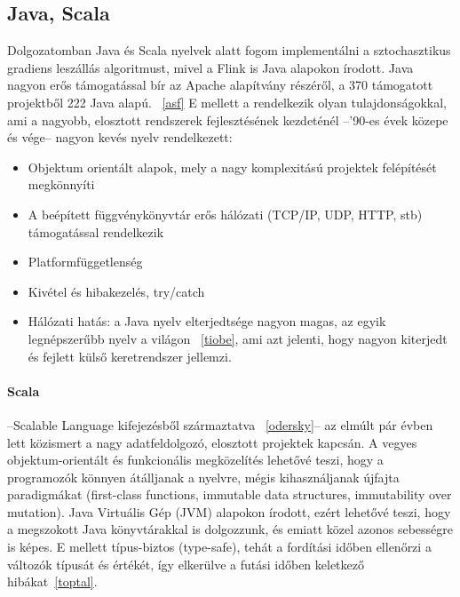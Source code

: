 \documentclass[a4paper,12pt]{article}
\begin{document}
\subsection{Java, Scala}
Dolgozatomban Java és Scala nyelvek alatt fogom implementálni a sztochasztikus gradiens leszállás algoritmust, mivel a Flink is Java alapokon írodott. Java nagyon erős támogatással bír az Apache alapítvány részéről, a 370 támogatott projektből 222 Java alapú. ~\ref{asf} E mellett a rendelkezik olyan tulajdonságokkal, ami a nagyobb, elosztott rendszerek fejlesztésének kezdeténél --'90-es évek közepe és vége-- nagyon kevés nyelv rendelkezett:
\begin{itemize}
\item Objektum orientált alapok, mely a nagy komplexitású projektek felépítését megkönnyíti
\item A beépített függvénykönyvtár erős hálózati (TCP/IP, UDP, HTTP, stb) támogatással rendelkezik
\item Platformfüggetlenség
\item Kivétel és hibakezelés, try/catch
\item Hálózati hatás: a Java nyelv elterjedtsége nagyon magas, az egyik legnépszerűbb nyelv a világon ~\ref{tiobe}, ami azt jelenti, hogy nagyon kiterjedt és fejlett külső keretrendszer jellemzi.
\end{itemize}

\paragraph{Scala}--Scalable Language kifejezésből származtatva ~\ref{odersky}-- az elmúlt pár évben lett közismert a nagy adatfeldolgozó, elosztott projektek kapcsán. A vegyes objektum-orientált és funkcionális megközelítés lehetővé teszi, hogy a programozók könnyen átálljanak a nyelvre, mégis kihasználjanak újfajta paradigmákat (first-class functions, immutable data structures, immutability over mutation). Java Virtuális Gép (JVM) alapokon írodott, ezért lehetővé teszi, hogy a megszokott Java könyvtárakkal is dolgozzunk, és emiatt közel azonos sebességre is képes.  E mellett típus-biztos (type-safe), tehát a fordítási időben ellenőrzi a változók típusát és értékét, így elkerülve a futási időben keletkező hibákat~\ref{toptal}. 
\end{document}
